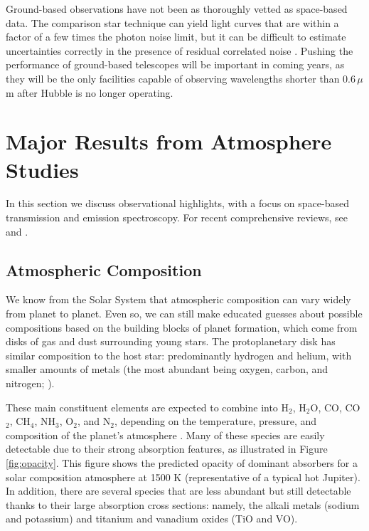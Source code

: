 \documentclass[graybox,natbib,nosecnum]{svmult}
\begin{document}
Ground-based observations have not been as thoroughly vetted as space-based data.  The comparison star technique can yield light curves that are within a factor of a few times the photon noise limit, but it can be difficult to estimate uncertainties correctly in the presence of residual correlated noise \citep[e.g.][]{jordan13, beatty16}.  Pushing the performance of ground-based telescopes will be important in coming years, as they will be the only facilities capable of observing wavelengths shorter than $0.6\,\mu$m after Hubble is no longer operating. 

\section{Major Results from Atmosphere Studies}
In this section we discuss observational highlights, with a focus on space-based transmission and emission spectroscopy.  For recent comprehensive reviews, see \cite{crossfield15} and \cite{deming17}. 

\subsection{Atmospheric Composition}
We know from the Solar System that atmospheric composition can vary widely from planet to planet. Even so, we can still make educated guesses about possible compositions based on the building blocks of planet formation,  which come from disks of gas and dust surrounding young stars.  The protoplanetary disk has similar composition to the host star: predominantly hydrogen and helium, with smaller amounts of metals (the most abundant being oxygen, carbon, and nitrogen; \citealt{anders89}).  %

These main constituent elements are expected to combine into H$_2$, H$_2$O, CO, CO$_2$, CH$_4$, NH$_3$, O$_2$, and N$_2$, depending on the temperature, pressure, and composition of the planet's atmosphere \citep{moses13}.  Many of these species are easily detectable due to their strong absorption features, as illustrated in Figure\,\ref{fig:opacity}.  This figure shows the predicted opacity of dominant absorbers for a solar composition atmosphere at 1500 K (representative of a typical hot Jupiter).  In addition, there are several species that are less abundant but still detectable thanks to their large absorption cross sections: namely, the alkali metals (sodium and potassium) and titanium and vanadium oxides (TiO and VO). 
\end{document}
